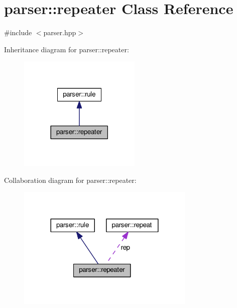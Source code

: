 \hypertarget{classparser_1_1repeater}{}\section{parser\+:\+:repeater Class Reference}
\label{classparser_1_1repeater}


{\ttfamily \#include $<$parser.\+hpp$>$}



Inheritance diagram for parser\+:\+:repeater\+:\nopagebreak
\begin{figure}[H]
\begin{center}
\leavevmode
\includegraphics[width=165pt]{classparser_1_1repeater__inherit__graph}
\end{center}
\end{figure}


Collaboration diagram for parser\+:\+:repeater\+:\nopagebreak
\begin{figure}[H]
\begin{center}
\leavevmode
\includegraphics[width=240pt]{classparser_1_1repeater__coll__graph}
\end{center}
\end{figure}
